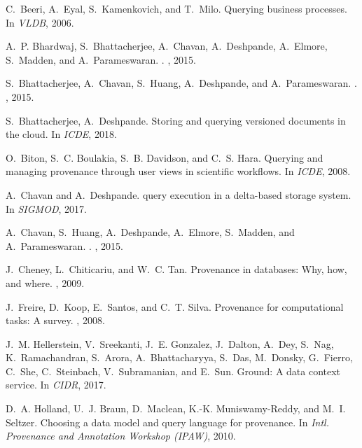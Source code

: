 \documentclass[11pt]{article}
\begin{document}
\begin{thebibliography}{10}
C.~Beeri, A.~Eyal, S.~Kamenkovich, and T.~Milo.
\newblock Querying business processes.
\newblock In {\em VLDB}, 2006.

A.~P. Bhardwaj, S.~Bhattacherjee, A.~Chavan, A.~Deshpande, A.~Elmore,
  S.~Madden, and A.~Parameswaran.
.
, 2015.

S.~Bhattacherjee, A.~Chavan, S.~Huang, A.~Deshpande, and A.~Parameswaran.
.
, 2015.

S.~Bhattacherjee, A.~Deshpande.
\newblock Storing and querying versioned documents in the cloud.
\newblock In {\em {ICDE}}, 2018.

O.~Biton, S.~C. Boulakia, S.~B. Davidson, and C.~S. Hara.
\newblock Querying and managing provenance through user views in scientific
  workflows.
\newblock In {\em ICDE}, 2008.

A.~Chavan and A.~Deshpande.
 query execution in a delta-based storage system.
\newblock In {\em SIGMOD}, 2017.

A.~Chavan, S.~Huang, A.~Deshpande, A.~Elmore, S.~Madden, and A.~Parameswaran.
.
, 2015.

J.~Cheney, L.~Chiticariu, and W.~C. Tan.
\newblock Provenance in databases: Why, how, and where.
, 2009.

J.~Freire, D.~Koop, E.~Santos, and C.~T. Silva.
\newblock Provenance for computational tasks: A survey.
, 2008.

J.~M. Hellerstein, V.~Sreekanti, J.~E. Gonzalez, J.~Dalton, A.~Dey, S.~Nag,
  K.~Ramachandran, S.~Arora, A.~Bhattacharyya, S.~Das, M.~Donsky, G.~Fierro,
  C.~She, C.~Steinbach, V.~Subramanian, and E.~Sun.
\newblock Ground: {A} data context service.
\newblock In {\em {CIDR}}, 2017.

D.~A. Holland, U.~J. Braun, D.~Maclean, K.-K. Muniswamy-Reddy, and M.~I.
  Seltzer.
\newblock Choosing a data model and query language for provenance.
\newblock In {\em Intl. Provenance and Annotation Workshop (IPAW)}, 2010.


\end{thebibliography}
\end{document}
